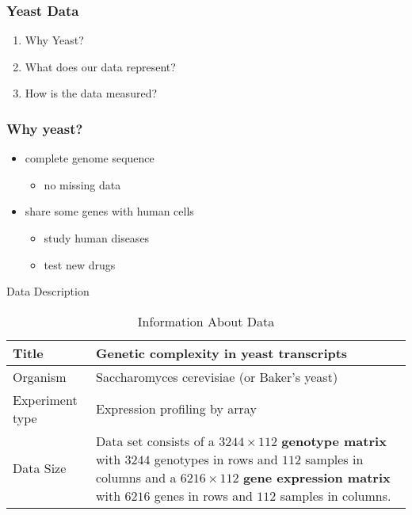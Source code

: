 \begin{frame}\frametitle{Yeast Data}
    \begin{enumerate}
        \item Why Yeast?
        \item What does our data represent?
        \item How is the data measured? 
    \end{enumerate}
\end{frame}

\begin{frame}\frametitle{Why yeast?}
    \begin{itemize}
    	\item complete genome sequence  
		\begin{itemize}
			\item no missing data 
		\end{itemize}    	
		\item share some genes with human cells   
		\begin{itemize}
			\item study human diseases
			\item test new drugs
		\end{itemize}		     

        
    \end{itemize}
\end{frame}

\begin{frame}{Data Description}
\begin{table}[h]
        \centering
        \begin{tabular}{|l|p{7cm}|}
            \hline
            Title                           &   Genetic complexity in yeast transcripts \\ \hline
            Organism                        &   Saccharomyces cerevisiae (or Baker's yeast)                \\ \hline
            Experiment type                 &   Expression profiling by array           \\ \hline
            \multirow{4}{*}{Data Size}      &   Data set consists of a $3244\times112$ \textbf{genotype matrix} with $3244$ genotypes in rows and $112$ samples in columns and a $6216\times112$ \textbf{gene expression matrix} with $6216$ genes in rows and $112$ samples in columns.  \\ \hline
        \end{tabular}
        \caption{Information About Data}
    \end{table}
\end{frame}

